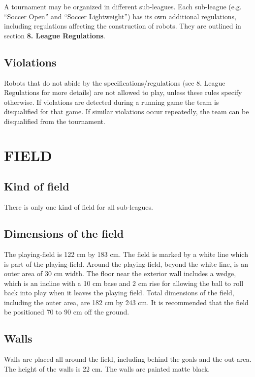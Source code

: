 \documentclass{article}
\begin{document}
A tournament may be organized in different sub-leagues. Each sub-league (e.g. ``Soccer Open'' and ``Soccer Lightweight'') has its own additional regulations, including regulations affecting the construction of robots. They are outlined in section \textbf{8. League Regulations}.

\subsection{ Violations \label{ref-027}}

Robots that do not abide by the specifications/regulations (see 8. League Regulations for more details) are not allowed to play, unless these rules specify otherwise. If violations are detected during a running game the team is disqualified for that game. If similar violations occur repeatedly, the team can be disqualified from the tournament.

\section{FIELD \label{ref-028}}

\subsection{ Kind of field \label{ref-029}}

There is only one kind of field for all sub-leagues.

\subsection{ Dimensions of the field \label{ref-030}}

The playing-field is 122 cm by 183 cm. The field is marked by a white line which is part of the playing-field. Around the playing-field, beyond the white line, is an outer area of 30 cm width. The floor near the exterior wall includes a wedge, which is an incline with a 10 cm base and 2 cm rise for allowing the ball to roll back into play when it leaves the playing field. Total dimensions of the field, including the outer area, are 182 cm by 243 cm. It is recommended that the field be positioned 70 to 90 cm off the ground.

\subsection{ Walls \label{ref-031}}

Walls are placed all around the field, including behind the goals and the out-area. The height of the walls is 22 cm. The walls are painted matte black.
\end{document}

